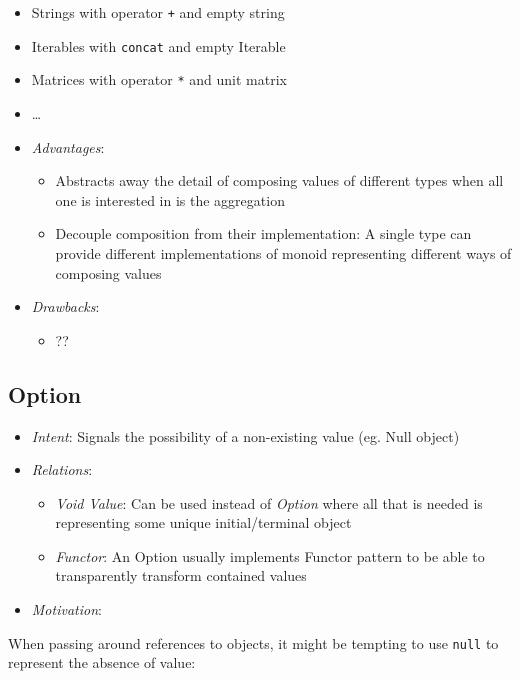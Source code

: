 \documentclass[11pt,]{article}
\begin{document}
\begin{itemize}
\item
  Strings with operator \texttt{+} and empty string
\item
  Iterables with \texttt{concat} and empty Iterable
\item
  Matrices with operator \texttt{*} and unit matrix
\item
  \ldots{}
\item
  \emph{Advantages}:

  \begin{itemize}
  \item
    Abstracts away the detail of composing values of different types
    when all one is interested in is the aggregation
  \item
    Decouple composition from their implementation: A single type can
    provide different implementations of monoid representing different
    ways of composing values
  \end{itemize}
\item
  \emph{Drawbacks}:

  \begin{itemize}
  \item
    ??
  \end{itemize}
\end{itemize}

\subsection{Option}

\begin{itemize}
\item
  \emph{Intent}: Signals the possibility of a non-existing value (eg.
  Null object)
\item
  \emph{Relations}:

  \begin{itemize}
  \item
    \emph{Void Value}: Can be used instead of \emph{Option} where all
    that is needed is representing some unique initial/terminal object
  \item
    \emph{Functor}: An Option usually implements Functor pattern to be
    able to transparently transform contained values
  \end{itemize}
\item
  \emph{Motivation}:
\end{itemize}

When passing around references to objects, it might be tempting to use
\texttt{null} to represent the absence of value:
\end{document}
